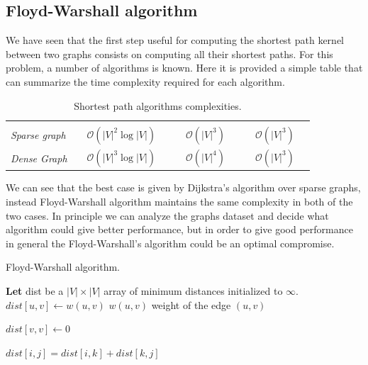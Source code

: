 \documentclass[11pt,a4paper]{article}
\begin{document}
\subsection{Floyd-Warshall algorithm}
We have seen that the first step useful for computing the shortest path kernel between two graphs consists on computing all their shortest paths.  For this problem, a number of algorithms is known. Here it is provided a simple table that can summarize the time complexity required for each algorithm. 

\renewcommand{\arraystretch}{1.5}
\begin{table}[!htbp]
	\centering
	\begin{tabularx}{\linewidth}{|Y|l|l|l|}
		 &  &  & \\
		
		\centering \textit{Sparse graph} & $\quad\mathcal{O}(|V|^2\log|V|)\quad$ & $\quad\mathcal{O}(|V|^3)\quad$ & $\quad\mathcal{O}(|V|^3)\quad$ \\
		
		\centering \textit{Dense Graph} & $\quad\mathcal{O}(|V|^3\log|V|)\quad$& $\quad\mathcal{O}(|V|^4)\quad$ & $\quad\mathcal{O}(|V|^3)\quad$ \\
	\end{tabularx}%
		\caption{Shortest path algorithms complexities.}
\end{table}
\renewcommand{\arraystretch}{1}
We can see that the best case is given by Dijkstra's algorithm over sparse graphs, instead Floyd-Warshall algorithm maintains the same complexity in both of the two cases. In principle we can analyze the graphs dataset and decide what algorithm could give better performance, but in order to give good performance in general the Floyd-Warshall's algorithm could be an optimal compromise.
\begin{algorithm}
	\caption{Floyd-Warshall algorithm.}
	\begin{algorithmic}[1]
		\State \textbf{Let} dist be a $|V| \times |V|$ array of minimum distances initialized to $\infty$.
			\State $dist[u,v] \leftarrow w(u,v)$ \Comment $w(u,v)$ weight of the edge $(u,v)$
		\EndFor
		
		
			\State $dist[v,v] \leftarrow 0$ 
		\EndFor
		

			
			
				
						\State $dist[i,j] = dist[i,k] + dist[k,j]$
					\EndIf
				\EndFor
			\EndFor
		\EndFor
		\EndProcedure
	\end{algorithmic}
\end{algorithm}
\end{document}
